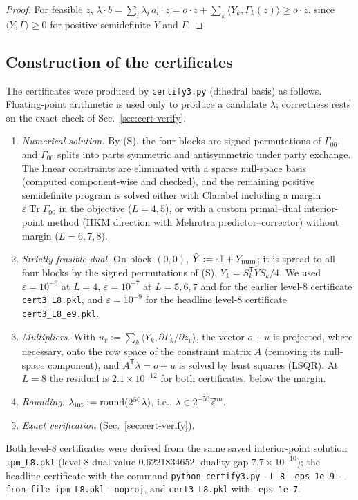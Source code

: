 \documentclass[aps,pra,onecolumn,notitlepage,superscriptaddress,longbibliography,nofootinbib,11pt]{revtex4-2}
\theoremstyle{remark}
\newcommand{\Tr}{\operatorname{Tr}}
\newcommand{\one}{\mathbb{I}}
\newcommand{\tp}{\mathsf{T}}
\newcommand{\ZZ}{\mathbb{Z}}
\newcommand{\file}[1]{\texttt{#1}}
\begin{document}
\begin{proof}
For feasible $z$, $\lambda\cdot b=\sum_i\lambda_i\,a_i\cdot z=o\cdot z+\sum_k\langle Y_k,\Gamma_k(z)\rangle\ge o\cdot z$, since $\langle Y,\Gamma\rangle\ge0$ for positive semidefinite $Y$ and $\Gamma$.
\end{proof}

\subsection{Construction of the certificates}\label{sec:cert-construct}

The certificates were produced by \file{certify3.py} (dihedral basis) as follows. Floating-point arithmetic is used only to produce a candidate $\lambda$; correctness rests on the exact check of Sec.~\ref{sec:cert-verify}.
\begin{enumerate}
\item \emph{Numerical solution.} By (S), the four blocks are signed permutations of $\Gamma_{00}$, and $\Gamma_{00}$ splits into parts symmetric and antisymmetric under party exchange. The linear constraints are eliminated with a sparse null-space basis (computed component-wise and checked), and the remaining positive semidefinite program is solved either with Clarabel including a margin $\varepsilon\Tr\Gamma_{00}$ in the objective ($L=4,5$), or with a custom primal--dual interior-point method (HKM direction with Mehrotra predictor--corrector) without margin ($L=6,7,8$).
\item \emph{Strictly feasible dual.} On block $(0,0)$, $\hat Y:=\varepsilon\one+Y_{\rm num}$; it is spread to all four blocks by the signed permutations of (S), $Y_k=S_k^\tp\hat YS_k/4$. We used $\varepsilon=10^{-6}$ at $L=4$, $\varepsilon=10^{-7}$ at $L=5,6,7$ and for the earlier level-8 certificate \file{cert3\_L8.pkl}, and $\varepsilon=10^{-9}$ for the headline level-8 certificate \file{cert3\_L8\_e9.pkl}.
\item \emph{Multipliers.} With $u_v:=\sum_k\langle Y_k,\partial\Gamma_k/\partial z_v\rangle$, the vector $o+u$ is projected, where necessary, onto the row space of the constraint matrix $A$ (removing its null-space component), and $A^\tp\lambda=o+u$ is solved by least squares (LSQR). At $L=8$ the residual is $2.1\times10^{-12}$ for both certificates, below the margin.
\item \emph{Rounding.} $\lambda_{\rm int}:={\rm round}(2^{50}\lambda)$, i.e., $\lambda\in2^{-50}\ZZ^m$.
\item \emph{Exact verification} (Sec.~\ref{sec:cert-verify}).
\end{enumerate}
Both level-8 certificates were derived from the same saved interior-point solution \file{ipm\_L8.pkl} (level-8 dual value $0.6221834652$, duality gap $7.7\times10^{-10}$); the headline certificate with the command \file{python certify3.py --L 8 --eps 1e-9 --from\_file ipm\_L8.pkl --noproj}, and \file{cert3\_L8.pkl} with \file{--eps 1e-7}.
\end{document}
